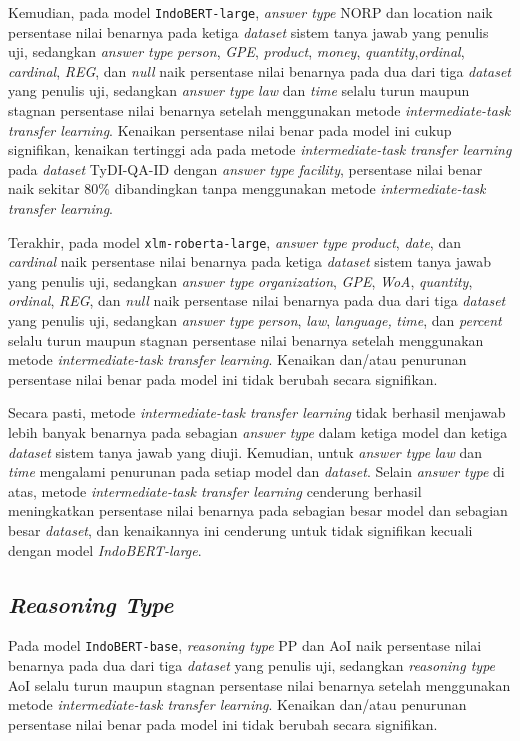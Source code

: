 Kemudian, pada model \texttt{IndoBERT-large}, \emph{answer type} NORP dan location naik persentase nilai benarnya pada ketiga \emph{dataset} sistem tanya jawab yang penulis uji, sedangkan \emph{answer type} \emph{person}, \emph{GPE}, \emph{product}, \emph{money}, \emph{quantity},\emph{ordinal}, \emph{cardinal}, \emph{REG}, dan \emph{null} naik persentase nilai benarnya pada dua dari tiga \emph{dataset} yang penulis uji, sedangkan \emph{answer type} \emph{law} dan \emph{time} selalu turun maupun stagnan persentase nilai benarnya setelah menggunakan metode \emph{intermediate-task transfer learning}. Kenaikan persentase nilai benar pada model ini cukup signifikan, kenaikan tertinggi ada pada metode \emph{intermediate-task transfer learning} pada \emph{dataset} TyDI-QA-ID dengan \emph{answer type} \emph{facility}, persentase nilai benar naik sekitar 80\% dibandingkan tanpa menggunakan metode \emph{intermediate-task transfer learning}.

Terakhir, pada model \texttt{xlm-roberta-large}, \emph{answer type} \emph{product}, \emph{date}, dan \emph{cardinal} naik persentase nilai benarnya pada ketiga \emph{dataset} sistem tanya jawab yang penulis uji, sedangkan \emph{answer type} \emph{organization}, \emph{GPE}, \emph{WoA}, \emph{quantity}, \emph{ordinal}, \emph{REG}, dan \emph{null} naik persentase nilai benarnya pada dua dari tiga \emph{dataset} yang penulis uji, sedangkan \emph{answer type} \emph{person}, \emph{law}, \emph{language,} \emph{time}, dan \emph{percent} selalu turun maupun stagnan persentase nilai benarnya setelah menggunakan metode \emph{intermediate-task transfer learning}. Kenaikan dan/atau penurunan persentase nilai benar pada model ini tidak berubah secara signifikan.

Secara pasti, metode \emph{intermediate-task transfer learning} tidak berhasil menjawab lebih banyak benarnya pada sebagian \emph{answer type} dalam ketiga model dan ketiga \emph{dataset} sistem tanya jawab yang diuji. Kemudian, untuk \emph{answer type} \emph{law} dan \emph{time} mengalami penurunan pada setiap model dan \emph{dataset}. Selain \emph{answer type} di atas, metode \emph{intermediate-task transfer learning} cenderung berhasil meningkatkan persentase nilai benarnya pada sebagian besar model dan sebagian besar \emph{dataset}, dan kenaikannya ini cenderung untuk tidak signifikan kecuali dengan model \emph{IndoBERT-large}. 

\subsection{\emph{Reasoning Type}}
Pada model \texttt{IndoBERT-base}, \emph{reasoning type} PP dan AoI naik persentase nilai benarnya pada dua dari tiga \emph{dataset} yang penulis uji, sedangkan \emph{reasoning type} AoI selalu turun maupun stagnan persentase nilai benarnya setelah menggunakan metode \emph{intermediate-task transfer learning}. Kenaikan dan/atau penurunan persentase nilai benar pada model ini tidak berubah secara signifikan.


